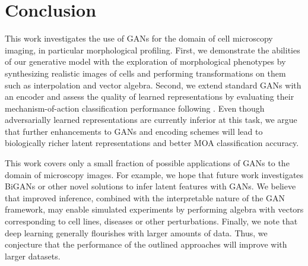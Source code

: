\documentclass{article}
\begin{document}
\section{Conclusion}
This work investigates the use of GANs for the domain of cell microscopy imaging, in particular morphological profiling. First, we demonstrate the abilities of our generative model with the exploration of morphological phenotypes by synthesizing realistic images of cells and performing transformations on them such as interpolation and vector algebra. Second, we extend standard GANs with an encoder and assess the quality of learned representations by evaluating their mechanism-of-action classification performance following \cite{Ljosa2013}. Even though adversarially learned representations are currently inferior at this task, we argue that further enhancements to GANs and encoding schemes will lead to biologically richer latent representations and better MOA classification accuracy.

This work covers only a small fraction of possible applications of GANs to the domain of microscopy images. For example, we hope that future work investigates BiGANs\cite{donahue2016adversarial} or other novel solutions to infer latent features with GANs. We believe that improved inference, combined with the interpretable nature of the GAN framework, may enable simulated experiments by performing algebra with vectors corresponding to cell lines, diseases or other perturbations. Finally, we note that deep learning generally flourishes with larger amounts of data. Thus, we conjecture that the performance of the outlined approaches will improve with larger datasets.
\newpage




\end{document}
